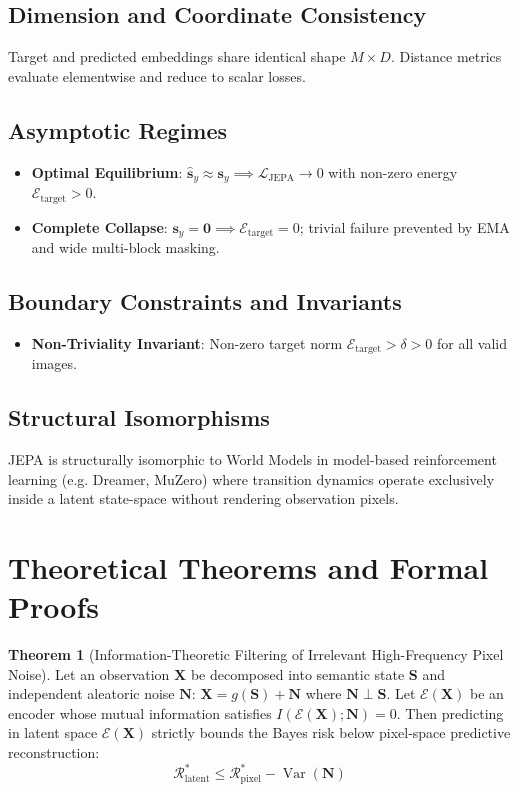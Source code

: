 \documentclass[11pt,a4paper]{article}
\theoremstyle{definition}
\newtheorem{theorem}{\textbf{Theorem}}[section]
\begin{document}
\subsection{Dimension and Coordinate Consistency}
Target and predicted embeddings share identical shape $M \times D$. Distance metrics evaluate elementwise and reduce to scalar losses.

\subsection{Asymptotic Regimes}
\begin{itemize}
    \item \textbf{Optimal Equilibrium}: $\hat{\mathbf{s}}_y \approx \mathbf{s}_y \implies \mathcal{L}_{\text{JEPA}} \to 0$ with non-zero energy $\mathcal{E}_{\text{target}} > 0$.
    \item \textbf{Complete Collapse}: $\mathbf{s}_y = \mathbf{0} \implies \mathcal{E}_{\text{target}} = 0$; trivial failure prevented by EMA and wide multi-block masking.
\end{itemize}

\subsection{Boundary Constraints and Invariants}
\begin{itemize}
    \item \textbf{Non-Triviality Invariant}: Non-zero target norm $\mathcal{E}_{\text{target}} > \delta > 0$ for all valid images.
\end{itemize}

\subsection{Structural Isomorphisms}
JEPA is structurally isomorphic to World Models in model-based reinforcement learning (e.g. Dreamer, MuZero) where transition dynamics operate exclusively inside a latent state-space without rendering observation pixels.

\section{Theoretical Theorems and Formal Proofs}

\begin{theorem}[Information-Theoretic Filtering of Irrelevant High-Frequency Pixel Noise]
Let an observation $\mathbf{X}$ be decomposed into semantic state $\mathbf{S}$ and independent aleatoric noise $\mathbf{N}$: $\mathbf{X} = g(\mathbf{S}) + \mathbf{N}$ where $\mathbf{N} \perp \mathbf{S}$. Let $\mathcal{E}(\mathbf{X})$ be an encoder whose mutual information satisfies $I(\mathcal{E}(\mathbf{X}); \mathbf{N}) = 0$. Then predicting in latent space $\mathcal{E}(\mathbf{X})$ strictly bounds the Bayes risk below pixel-space predictive reconstruction:
{\boldmath
\begin{equation}
\mathcal{R}_{\text{latent}}^* \le \mathcal{R}_{\text{pixel}}^* - \operatorname{Var}(\mathbf{N})
\end{equation}
}
\end{theorem}
\end{document}

